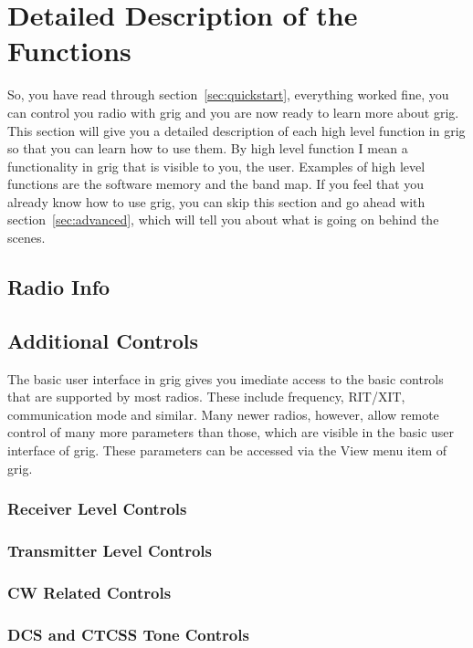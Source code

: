 \section{Detailed Description of the Functions}\label{sec:detail}

So, you have read through section~\ref{sec:quickstart}, everything
worked fine, you can control you radio with grig and you are now ready
to learn more about grig. This section will give you a detailed
description of each high level function in grig so that you can learn
how to use them. By high level function I mean a functionality in grig
that is visible to you, the user. Examples of high level functions are
the software memory and the band map. If you feel that you already know
how to use grig, you can skip this section and go ahead with
section~\ref{sec:advanced}, which will tell you about what is going on
behind the scenes.



\subsection{Radio Info}


\subsection{Additional Controls}

The basic user interface in grig gives you imediate access to the basic
controls that are supported by most radios. These include frequency,
RIT/XIT, communication mode and similar. Many newer radios, however,
allow remote control of many more parameters than those, which are
visible in the basic user interface of grig. These parameters can be
accessed via the View menu item of grig.

\subsubsection{Receiver Level Controls}

\subsubsection{Transmitter Level Controls}

\subsubsection{CW Related Controls}

\subsubsection{DCS and CTCSS Tone Controls}

